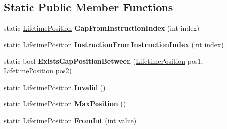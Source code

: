 \subsection*{Static Public Member Functions}
\begin{DoxyCompactItemize}
\item 
static \hyperlink{classv8_1_1internal_1_1compiler_1_1_lifetime_position}{Lifetime\+Position} {\bfseries Gap\+From\+Instruction\+Index} (int index)\hypertarget{classv8_1_1internal_1_1compiler_1_1_lifetime_position_a99d5d744a757b2795d0fc42a315406a9}{}\label{classv8_1_1internal_1_1compiler_1_1_lifetime_position_a99d5d744a757b2795d0fc42a315406a9}

\item 
static \hyperlink{classv8_1_1internal_1_1compiler_1_1_lifetime_position}{Lifetime\+Position} {\bfseries Instruction\+From\+Instruction\+Index} (int index)\hypertarget{classv8_1_1internal_1_1compiler_1_1_lifetime_position_a32d9eb60b66b5eddb94c8a8bd69a877c}{}\label{classv8_1_1internal_1_1compiler_1_1_lifetime_position_a32d9eb60b66b5eddb94c8a8bd69a877c}

\item 
static bool {\bfseries Exists\+Gap\+Position\+Between} (\hyperlink{classv8_1_1internal_1_1compiler_1_1_lifetime_position}{Lifetime\+Position} pos1, \hyperlink{classv8_1_1internal_1_1compiler_1_1_lifetime_position}{Lifetime\+Position} pos2)\hypertarget{classv8_1_1internal_1_1compiler_1_1_lifetime_position_a160fe342f01d4d9203f37e82877c358c}{}\label{classv8_1_1internal_1_1compiler_1_1_lifetime_position_a160fe342f01d4d9203f37e82877c358c}

\item 
static \hyperlink{classv8_1_1internal_1_1compiler_1_1_lifetime_position}{Lifetime\+Position} {\bfseries Invalid} ()\hypertarget{classv8_1_1internal_1_1compiler_1_1_lifetime_position_ab394c19abb7a07b49916bdecd6e0bd17}{}\label{classv8_1_1internal_1_1compiler_1_1_lifetime_position_ab394c19abb7a07b49916bdecd6e0bd17}

\item 
static \hyperlink{classv8_1_1internal_1_1compiler_1_1_lifetime_position}{Lifetime\+Position} {\bfseries Max\+Position} ()\hypertarget{classv8_1_1internal_1_1compiler_1_1_lifetime_position_a0db50cd0c61da89622ba974be2de6af4}{}\label{classv8_1_1internal_1_1compiler_1_1_lifetime_position_a0db50cd0c61da89622ba974be2de6af4}

\item 
static \hyperlink{classv8_1_1internal_1_1compiler_1_1_lifetime_position}{Lifetime\+Position} {\bfseries From\+Int} (int value)\hypertarget{classv8_1_1internal_1_1compiler_1_1_lifetime_position_a40882269e85e8ace1d98b82e0e6419c2}{}\label{classv8_1_1internal_1_1compiler_1_1_lifetime_position_a40882269e85e8ace1d98b82e0e6419c2}

\end{DoxyCompactItemize}
